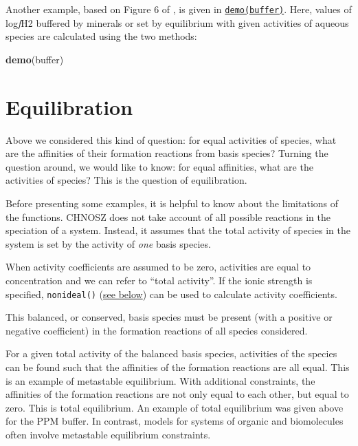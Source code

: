 \documentclass[]{tufte-book}
\newenvironment{Shaded}{}{}
\newcommand{\KeywordTok}[1]{\textcolor[rgb]{0.00,0.44,0.13}{\textbf{#1}}}
\newcommand{\NormalTok}[1]{#1}
\begin{document}
Another example, based on Figure 6 of \citet{SS95}, is given in
\href{../demo}{{\texttt{demo(buffer)}}}. Here, values of log\emph{f}H2
buffered by minerals or set by equilibrium with given activities of
aqueous species are calculated using the two methods:

\begin{Shaded}
\begin{Highlighting}[]
\KeywordTok{demo}\NormalTok{(buffer)}
\end{Highlighting}
\end{Shaded}

\hypertarget{equilibration}{\chapter{Equilibration}\label{equilibration}}

Above we considered this kind of question: for equal activities of
species, what are the affinities of their formation reactions from basis
species? Turning the question around, we would like to know: for equal
affinities, what are the activities of species? This is the question of
equilibration.

Before presenting some examples, it is helpful to know about the
limitations of the functions. CHNOSZ does not take account of all
possible reactions in the speciation of a system. Instead, it assumes
that the total activity of species in the system is set by the activity
of \emph{one} basis species.

\begin{marginfigure}
When activity coefficients are assumed to be zero, activities are equal
to concentration and we can refer to ``total activity''. If the ionic
strength is specified, {\texttt{nonideal()}}
(\protect\hyperlink{activity-coefficients}{see below}) can be used to
calculate activity coefficients.
\end{marginfigure}

This balanced, or conserved, basis species must be present (with a
positive or negative coefficient) in the formation reactions of all
species considered.

For a given total activity of the balanced basis species, activities of
the species can be found such that the affinities of the formation
reactions are all equal. This is an example of metastable equilibrium.
With additional constraints, the affinities of the formation reactions
are not only equal to each other, but equal to zero. This is total
equilibrium. An example of total equilibrium was given above for the PPM
buffer. In contrast, models for systems of organic and biomolecules
often involve metastable equilibrium constraints.
\end{document}
